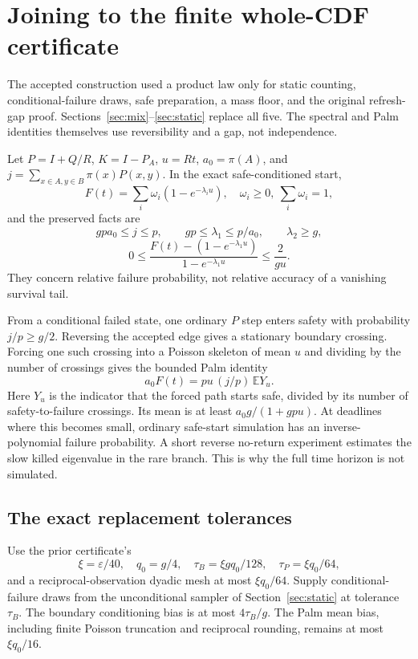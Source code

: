 \documentclass[11pt]{article}
\newcommand{\E}{\mathbb E}
\newcommand{\eps}{\varepsilon}
\begin{document}
\section{Joining to the finite whole-CDF certificate}
\label{sec:join}
The accepted construction \cite{prior} used a product law only for static counting, conditional-failure draws, safe preparation, a mass floor, and the original refresh-gap proof. Sections~\ref{sec:mix}--\ref{sec:static} replace all five. The spectral and Palm identities themselves use reversibility and a gap, not independence.

Let $P=I+Q/R$, $K=I-P_A$, $u=Rt$, $a_0=\pi(A)$, and $j=\sum_{x\in A,y\in B}\pi(x)P(x,y)$. In the exact safe-conditioned start,
\[
 F(t)=\sum_i\omega_i(1-e^{-\lambda_i u}),\quad
 \omega_i\ge0,\ \sum_i\omega_i=1,
\]
and the preserved facts are
\[
 gpa_0\le j\le p,\qquad gp\le\lambda_1\le p/a_0,\qquad
 \lambda_2\ge g,
\]
\[
 0\le\frac{F(t)-(1-e^{-\lambda_1u})}{1-e^{-\lambda_1u}}
 \le\frac2{gu}.
\]
They concern relative failure probability, not relative accuracy of a vanishing survival tail.

From a conditional failed state, one ordinary $P$ step enters safety with probability $j/p\ge g/2$. Reversing the accepted edge gives a stationary boundary crossing. Forcing one such crossing into a Poisson skeleton of mean $u$ and dividing by the number of crossings gives the bounded Palm identity
\[
 a_0F(t)=pu\,(j/p)\,\E Y_u.
\]
Here $Y_u$ is the indicator that the forced path starts safe, divided by its number of safety-to-failure crossings. Its mean is at least $a_0g/(1+gpu)$. At deadlines where this becomes small, ordinary safe-start simulation has an inverse-polynomial failure probability. A short reverse no-return experiment estimates the slow killed eigenvalue in the rare branch. This is why the full time horizon is not simulated.

\subsection{The exact replacement tolerances}
Use the prior certificate's
\[
 \xi=\eps/40,\quad q_0=g/4,\quad
 \tau_B=\xi gq_0/128,\quad \tau_P=\xi q_0/64,
\]
and a reciprocal-observation dyadic mesh at most $\xi q_0/64$. Supply conditional-failure draws from the unconditional sampler of Section~\ref{sec:static} at tolerance $\tau_B$. The boundary conditioning bias is at most $4\tau_B/g$. The Palm mean bias, including finite Poisson truncation and reciprocal rounding, remains at most $\xi q_0/16$.
\end{document}
